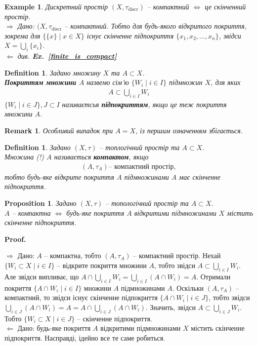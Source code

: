 \documentclass[a4paper, 10pt]{article}
\makeatletter
\def\rightproof{$\boxed{\Rightarrow}$ }
\def\leftproof{$\boxed{\Leftarrow}$ }
\theoremstyle{theoremdd}
\newtheorem{definition}[theorem]{Definition}
\newtheorem{example}[theorem]{Example}
\newtheorem{proposition}[theorem]{Proposition}
\newtheorem{remark}[theorem]{Remark}
\newcommand\exref[1]{\textbf{Ex.~\ref{#1}}}
\renewenvironment{proof}[1][Proof.\\]{\par
\pushQED{\hfill \qed}%
\normalfont \topsep6\p@\@plus6\p@\relax
\trivlist
\item\relax
{\bfseries
#1\@addpunct{.}}\hspace\labelsep\ignorespaces
}{%
\popQED\endtrivlist\@endpefalse
}
\makeatother
\begin{document}
\begin{example}
Дискретний простір $(X,\tau_{\text{discr}})$ -- компактний $\iff$ це скінченний простір.\\
\rightproof Дано: $(X,\tau_{\text{discr}}$ -- компактний. Тобто для будь-якого відкритого покриття, зокрема для $\{ \{x\} \mid x \in X\}$ існує скінченне підпокриття $\{ x_1,x_2,\dots,x_n\}$, звідси $X = \displaystyle\bigcup_i \{x_i\}$.\\
\leftproof \textit{див.} \exref{finite_is_compact}
\end{example}

\begin{definition}
Задано множину $X$ та $A \subset X$.\\
\textbf{Покриттям множини $A$} назвемо сім'ю $\{W_i \mid i \in I\}$ підмножин $X$, для яких
\begin{align*}
A \subset \bigcup_{i \in I} W_i
\end{align*}
$\{W_i \mid i \in J\}, J \subset I$ називаєтсья \textbf{підпокриттям}, якщо це теж покриття множини $A$.
\end{definition}

\begin{remark}
Особливий випадок при $A = X$, із першим означенням збігається.
\end{remark}

\begin{definition}
Задано $(X,\tau)$ -- топлогічний простір та $A \subset X$.\\
Множина (!) $A$ називається \textbf{компактом}, якщо
\begin{align*}
(A,\tau_A) \text{-- компактний простір},
\end{align*}
тобто будь-яке відкрите покриття $A$ підмножинами $A$ має скінченне підпокриття.
\end{definition}

\begin{proposition}
Задано $(X,\tau)$ -- топологічний простір та $A \subset X$.\\
$A$ -- компактна $\iff$ будь-яке покриття $A$ відкритими підмножинами $X$ містить скінченне підпокриття.
\end{proposition}

\begin{proof}
\rightproof Дано: $A$ -- компактна, тобто $(A,\tau_A)$ -- компактний простір. Нехай $\{W_i \subset X \mid i \in I\}$ -- відкрите покриття множини $A$, тобто звідси $A \subset \displaystyle\bigcup_{i \in I} W_i$. Але звідси випливає, що $A \cap \displaystyle\bigcup_{i \in I} W_i = \bigcup_{i \in I} (A \cap W_i) = A$. Отримали покриття $\{ A \cap W_i \mid i \in I\}$ множини $A$ підмножинами $A$. Оскільки $(A,\tau_A)$ -- компактний, то звідси існує скінченне підпокриття $\{ A \cap W_i \mid i \in J\}$, тобто звідси $\displaystyle\bigcup_{i \in J} (A \cap W_i) = A = A \cap \bigcup_{i \in J} (A \cap W_i)$. Значить, звідси $A \subset \displaystyle\bigcup_{i \in J} W_i$. Тобто $\{W_i \subset X \mid i \in J\}$ -- скінченне підпокриття.
\bigskip \\
\leftproof Дано: будь-яке покриття $A$ відкритими підмножинами $X$ містить скінченне підпокриття. Насправді, ідейно все те саме робиться.
\end{proof}
\end{document}
